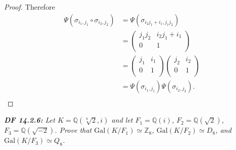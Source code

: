 \documentclass{article}
\begin{document}
\begin{proof}
    Therefore
    \begin{align*}
      \Psi(\sigma_{i_1,j_1}\circ\sigma_{i_2,j_2})
        &=\Psi(\sigma_{i_2j_1+i_1,j_1j_2})\\
      &=\begin{pmatrix} j_1j_2 &i_2j_1+i_1\\ 0&1\\ \end{pmatrix} \\
      &=\begin{pmatrix} j_1 &i_1\\ 0&1\\ \end{pmatrix} \begin{pmatrix} j_2
        &i_2\\ 0&1\\ \end{pmatrix}\\
      &=\Psi(\sigma_{i_1,j_1}) \Psi(\sigma_{i_2,j_2}).\\
    \end{align*}
  \end{proof}

\it \textbf{DF 14.2.6:} Let $K=\mathbb{Q}(\sqrt[8]{2},i)$ and let
  $F_1=\mathbb{Q}(i)$, $F_2=\mathbb{Q}(\sqrt{2})$,
  $F_3=\mathbb{Q}(\sqrt{-2})$. Prove that
  $\text{Gal}(K/F_1)\simeq\mathbb{Z}_8$, $\text{Gal}(K/F_2)\simeq D_8$, and
  $\text{Gal}(K/F_3)\simeq Q_8$.
\end{document}
